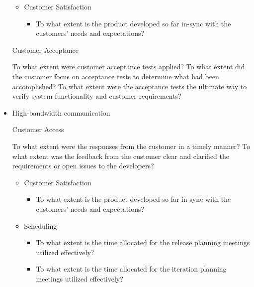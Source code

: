 \begin{itemize}
\begin{itemize}
\begin{itemize}
				\end{itemize}
		\end{itemize}
		\begin{itemize}
			\item Customer Satisfaction
				\begin{itemize}
					\item To what extent is the product developed so far in-sync with the customers' needs and expectations?
				\end{itemize}
		\end{itemize}
		\begin{itemize}
			\indicatorAddition Customer Acceptance
				\begin{itemize}
					\addition To what extent were customer acceptance tests applied?
					\addition To what extent did the customer focus on acceptance tests to determine what had been accomplished?
					\addition To what extent were the acceptance tests the ultimate way to verify system functionality and customer requirements?
				\end{itemize}
		\end{itemize}
	\item High-bandwidth communication
		\begin{itemize}
			\indicatorAddition Customer Access
				\begin{itemize}
					\addition To what extent were the responses from the customer in a timely manner?
					\addition To what extent was the feedback from the customer clear and clarified the requirements or open issues to the developers?
				\end{itemize}
		\end{itemize}
		\begin{itemize}
			\item Customer Satisfaction
				\begin{itemize}
					\item To what extent is the product developed so far in-sync with the customers' needs and expectations?
				\end{itemize}
			\item Scheduling
				\begin{itemize}
					\item To what extent is the time allocated for the release planning meetings utilized effectively? 
					\item To what extent is the time allocated for the iteration planning meetings utilized effectively?

\end{itemize}
\end{itemize}
\end{itemize}
